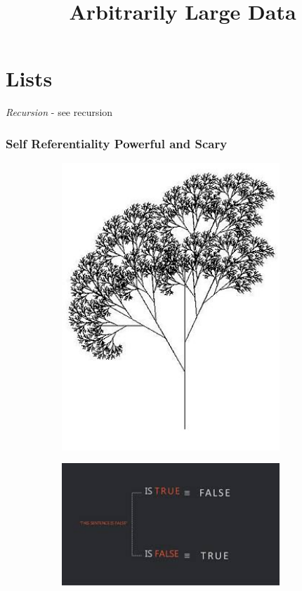 \documentclass{beamer}
\title{Arbitrarily Large Data}
\begin{document}
\begin{frame}
\titlepage
\end{frame}
\section{Lists}

\begin{frame}
  \huge \emph{Recursion} - see recursion
\end{frame}

\begin{frame}
  \frametitle{Self Referentiality Powerful and Scary}
  \begin{figure}
    \begin{subfigure}{0.3\textwidth}
      \includegraphics[width=0.9\textwidth]{images/recursive-tree.JPG}
    \end{subfigure}
    \begin{subfigure}{0.3\textwidth}
      \includegraphics[width=0.9\textwidth]{images/liars-paradox.jpeg}

\end{subfigure}
\end{figure}
\end{frame}
\end{document}
